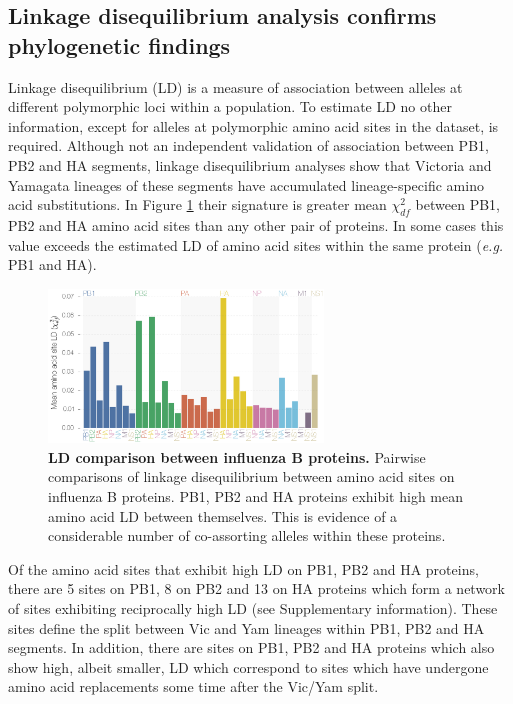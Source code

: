 \documentclass[11pt,oneside,letterpaper]{article}
\begin{document}
\subsection*{Linkage disequilibrium analysis confirms phylogenetic findings}
Linkage disequilibrium (LD) is a measure of association between alleles at different polymorphic loci within a population.
To estimate LD no other information, except for alleles at polymorphic amino acid sites in the dataset, is required.
Although not an independent validation of association between PB1, PB2 and HA segments, linkage disequilibrium analyses show that Victoria and Yamagata lineages of these segments have accumulated lineage-specific amino acid substitutions.
In Figure \ref{segmentLD} their signature is greater mean $\chi^{2}_{df}$ between PB1, PB2 and HA amino acid sites than any other pair of proteins.
In some cases this value exceeds the estimated LD of amino acid sites within the same protein (\textit{e.g.} PB1 and HA).

\begin{figure}[h]
	\centering	
	\includegraphics[width=0.65\textwidth]{figures/InfB_aaMeanLD.png}
	\caption{\textbf{LD comparison between influenza B proteins.}
Pairwise comparisons of linkage disequilibrium between amino acid sites on influenza B proteins.
PB1, PB2 and HA proteins exhibit high mean amino acid LD between themselves.
This is evidence of a considerable number of co-assorting alleles within these proteins.}
	\label{segmentLD}
\end{figure}

Of the amino acid sites that exhibit high LD on PB1, PB2 and HA proteins, there are 5 sites on PB1, 8 on PB2 and 13 on HA proteins which form a network of sites exhibiting reciprocally high LD (see Supplementary information).
These sites define the split between Vic and Yam lineages within PB1, PB2 and HA segments.
In addition, there are sites on PB1, PB2 and HA proteins which also show high, albeit smaller, LD which correspond to sites which have undergone amino acid replacements some time after the Vic/Yam split.
\end{document}
